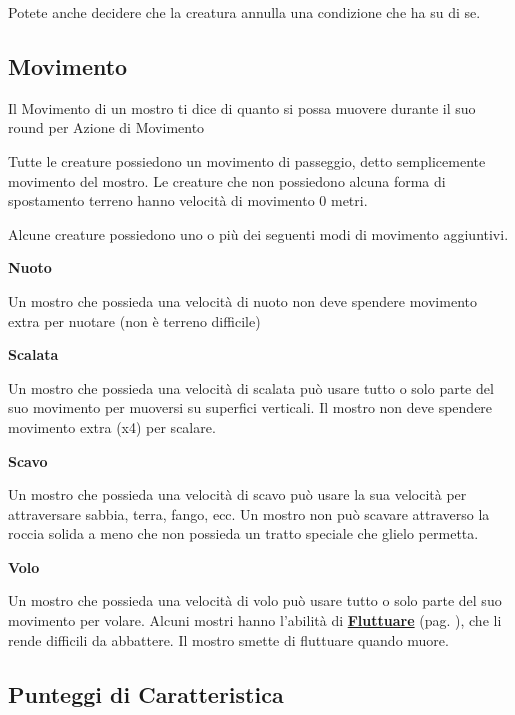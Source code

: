 \begin{multicols}{2}
\medskip

Potete anche decidere che la creatura annulla una condizione che ha su di se.

\subsection{Movimento}

Il Movimento di un mostro ti dice di quanto si possa muovere durante il suo round per Azione di Movimento

Tutte le creature possiedono un movimento di passeggio, detto semplicemente movimento del mostro. Le creature che non possiedono alcuna forma di spostamento terreno hanno velocità di movimento 0 metri.

Alcune creature possiedono uno o più dei seguenti modi di movimento aggiuntivi.



\smallskip\textbf{Nuoto}

Un mostro che possieda una velocità di nuoto non deve spendere movimento extra per nuotare (non è terreno difficile)

\smallskip\textbf{Scalata}

Un mostro che possieda una velocità di scalata può usare tutto o solo parte del suo movimento per muoversi su superfici verticali. Il mostro non deve spendere movimento extra (x4) per scalare.

\smallskip\textbf{Scavo}

Un mostro che possieda una velocità di scavo può usare la sua velocità per attraversare sabbia, terra, fango, ecc. Un mostro non può scavare attraverso la roccia solida a meno che non possieda un tratto speciale che glielo permetta.

\smallskip\textbf{Volo}

Un mostro che possieda una velocità di volo può usare tutto o solo parte del suo movimento per volare. Alcuni mostri hanno l'abilità di \hyperlink{Fluttuare}{\textbf{Fluttuare}} (pag. \pageref{Fluttuare}), che li rende difficili da abbattere. Il mostro smette di fluttuare quando muore.

\subsection{Punteggi di Caratteristica}


\end{multicols}
